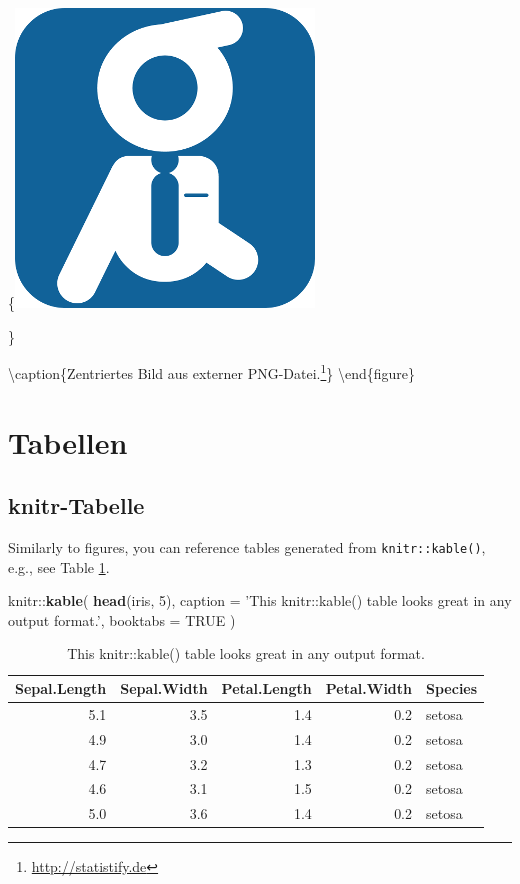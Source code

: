 \documentclass[]{book}
\makeatletter
\newenvironment{Shaded}{\begin{snugshade}}{\end{snugshade}}
\newcommand{\KeywordTok}[1]{\textcolor[rgb]{0.13,0.29,0.53}{\textbf{{#1}}}}
\newcommand{\DataTypeTok}[1]{\textcolor[rgb]{0.13,0.29,0.53}{{#1}}}
\newcommand{\DecValTok}[1]{\textcolor[rgb]{0.00,0.00,0.81}{{#1}}}
\newcommand{\StringTok}[1]{\textcolor[rgb]{0.31,0.60,0.02}{{#1}}}
\newcommand{\OtherTok}[1]{\textcolor[rgb]{0.56,0.35,0.01}{{#1}}}
\newcommand{\NormalTok}[1]{{#1}}
\let\rmarkdownfootnote\footnote%
\def\footnote{\protect\rmarkdownfootnote}
\newenvironment{kframe}{%
\medskip{}
\setlength{\fboxsep}{.8em}
 \def\at@end@of@kframe{}%
 \ifinner\ifhmode%
  \def\at@end@of@kframe{\end{minipage}}%
  \begin{minipage}{\columnwidth}%
 \fi\fi%
 \def\FrameCommand##1{\hskip\@totalleftmargin \hskip-\fboxsep
 \colorbox{shadecolor}{##1}\hskip-\fboxsep
     \hskip-\linewidth \hskip-\@totalleftmargin \hskip\columnwidth}%
 \MakeFramed {\advance\hsize-\width
   \@totalleftmargin\z@ \linewidth\hsize
   \@setminipage}}%
 {\par\unskip\endMakeFramed%
 \at@end@of@kframe}
\renewenvironment{Shaded}{\begin{kframe}}{\end{kframe}}
\theoremstyle{definition}
\theoremstyle{definition}
\theoremstyle{remark}
\makeatother
\begin{document}
\{\centering \includegraphics[width=0.328\linewidth]{img/important}

\}

\textbackslash{}caption\{Zentriertes Bild aus externer
PNG-Datei.\footnote{\url{http://statistify.de}}\}\label{fig:externalImage}
\textbackslash{}end\{figure\}

\section{Tabellen}\label{tabellen}

\subsection{knitr-Tabelle}\label{knitr-tabelle}

Similarly to figures, you can reference tables generated from
\texttt{knitr::kable()}, e.g., see Table \ref{tab:knitrTable}.

\begin{Shaded}
\begin{Highlighting}[]
\NormalTok{knitr::}\KeywordTok{kable}\NormalTok{(}
  \KeywordTok{head}\NormalTok{(iris, }\DecValTok{5}\NormalTok{), }\DataTypeTok{caption =} \StringTok{'This knitr::kable() table looks great in any output format.'}\NormalTok{,}
  \DataTypeTok{booktabs =} \OtherTok{TRUE}
\NormalTok{)}
\end{Highlighting}
\end{Shaded}

\begin{table}

\caption{\label{tab:knitrTable}This knitr::kable() table looks great in any output format.}
\centering
\begin{tabular}[t]{rrrrl}
\toprule
Sepal.Length & Sepal.Width & Petal.Length & Petal.Width & Species\\
\midrule
5.1 & 3.5 & 1.4 & 0.2 & setosa\\
4.9 & 3.0 & 1.4 & 0.2 & setosa\\
4.7 & 3.2 & 1.3 & 0.2 & setosa\\
4.6 & 3.1 & 1.5 & 0.2 & setosa\\
5.0 & 3.6 & 1.4 & 0.2 & setosa\\
\bottomrule
\end{tabular}
\end{table}
\end{document}
